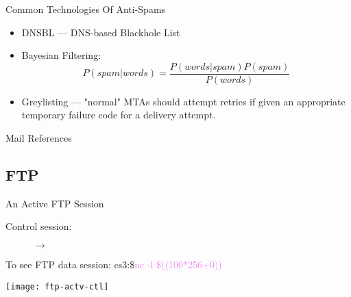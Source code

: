 \begin{frame}{Common Technologies Of Anti-Spams}
  \begin{itemize}
  \item DNSBL --- DNS-based Blackhole List
  \item Bayesian Filtering: $$P(spam|words) = \frac{P(words|spam)P(spam)}{P(words)}$$
  \item Greylisting --- "normal" MTAs should attempt retries if given an appropriate
    temporary failure code for a delivery attempt.
  \end{itemize}
\end{frame}

\begin{frame}[allowframebreaks]{Mail References}
  \begin{refsection}
    \nocite{wiki:smtp, wiki:pop, wiki:imap, wiki:mime, rfc2821, rfc1939,
      rfc3501, rfc2045}
    \printbibliography[heading=none]
  \end{refsection}
\end{frame}

\subsection{FTP}
  
\begin{frame}
  \centering
  \label{fig:model}
\end{frame}

\begin{frame}{An Active FTP Session}
  \begin{minipage}{.4\linewidth}
    \begin{description}
    \item[Control session:] $\longrightarrow$
    \end{description}
    \begin{iblock}{To see FTP data session:}
      {\ttfamily\small cs3:\$\quad\textcolor{violet}{nc -l \$((100*256+0))}}
    \end{iblock}
  \end{minipage}\hfill
  \begin{minipage}{.6\linewidth}
    \texttt{[image: ftp-actv-ctl]}
  \end{minipage}
\end{frame}

